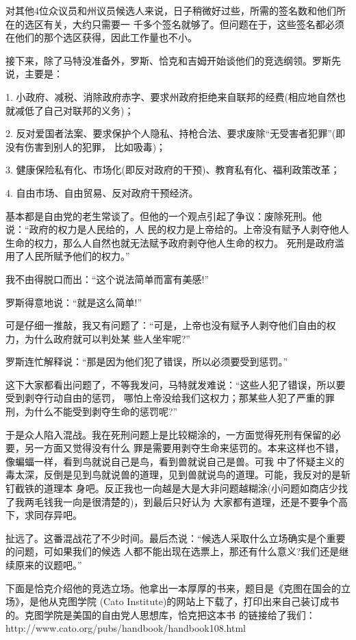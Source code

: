 ﻿\documentclass[11pt]{article}
\begin{document}
对其他4位众议员和州议员候选人来说，日子稍微好过些，所需的签名数和他们所在的选区有关，大约只需要一
千多个签名就够了。但问题在于，这些签名都必须在他们的那个选区获得，因此工作量也不小。

接下来，除了马特没准备外，罗斯、恰克和吉姆开始谈他们的竞选纲领。罗斯先说，主要是：

1. 小政府、减税、消除政府赤字、要求州政府拒绝来自联邦的经费(相应地自然也就减低了自己对联邦的义务)；

2. 反对爱国者法案、要求保护个人隐私、持枪合法、要求废除``无受害者犯罪''(即没有伤害到别人的犯罪，
比如吸毒)；

3. 健康保险私有化、市场化(即反对政府的干预)、教育私有化、福利政策改革；

4. 自由市场、自由贸易、反对政府干预经济。

基本都是自由党的老生常谈了。但他的一个观点引起了争议：废除死刑。他说：``政府的权力是人民给的，人
民的权力是上帝给的。上帝没有赋予人剥夺他人生命的权力，那么人自然也就无法赋予政府剥夺他人生命的权力。
死刑是政府滥用了人民所赋予他们的权力。''

我不由得脱口而出：``这个说法简单而富有美感!''

罗斯得意地说：``就是这么简单!''

可是仔细一推敲，我又有问题了：``可是，上帝也没有赋予人剥夺他们自由的权力，为什么政府就可以判处某
些人坐牢呢?''

罗斯连忙解释说：``那是因为他们犯了错误，所以必须要受到惩罚。''

这下大家都看出问题了，不等我发问，马特就发难说：``这些人犯了错误，所以要受到剥夺行动自由的惩罚，
哪怕上帝没给我们这权力；那某些人犯了严重的罪刑，为什么不能受到剥夺生命的惩罚呢?''

于是众人陷入混战。我在死刑问题上是比较糊涂的，一方面觉得死刑有保留的必要，另一方面又觉得没有什么
罪是需要用剥夺生命来惩罚的。本来这样也不错，像蝙蝠一样，看到鸟就说自己是鸟，看到兽就说自己是兽。可我
中了怀疑主义的毒太深，反倒是见到鸟就说兽的道理，见到兽就说鸟的道理。可能，我反对的是斩钉截铁的道理本
身吧。反正我也一向越是大是大非问题越糊涂(小问题如商店少找了我两毛钱我一向是很清楚的)，到最后只好认为
大家都有道理，还是不要争个高下，求同存异吧。

扯远了。这番混战花了不少时间。最后杰说：``候选人采取什么立场确实是个重要的问题，可如果我们的候选
人都不能出现在选票上，那还有什么意义?我们还是继续原来的议题吧。''

下面是恰克介绍他的竞选立场。他拿出一本厚厚的书来，题目是《克图在国会的立场》，是他从克图学院
(Cato Institute)的网站上下载了，打印出来自己装订成书的。克图学院是美国的自由党人思想库，恰克把这本书
的链接给了我们：http://www.cato.org/pubs/handbook/handbook108.html
\end{document}
